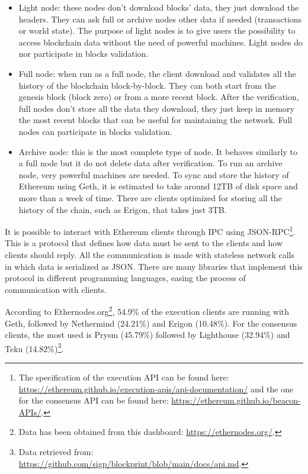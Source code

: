 \begin{itemize}
    \item Light node: these nodes don't download blocks' data, they just download the headers. They can ask full or archive nodes other data if needed (transactions or world state). The purpose of light nodes is to give users the possibility to access blockchain data without the need of powerful machines. Light nodes do nor participate in blocks validation.
    \item Full node: when run as a full node, the client download and validates all the history of the blockchain block-by-block. They can both start from the genesis block (block zero) or from a more recent block. After the verification, full nodes don't store all the data they download, they just keep in memory the most recent blocks that can be useful for maintaining the network. Full nodes can participate in blocks validation.
    \item Archive node: this is the most complete type of node. It behaves similarly to a full node but it do not delete data after verification. To run an archive node, very powerful machines are needed. To sync and store the history of Ethereum using Geth, it is estimated to take around 12TB of disk space and more than a week of time. There are clients optimized for storing all the history of the chain, such as Erigon, that takes just 3TB. 
\end{itemize}

It is possible to interact with Ethereum clients through IPC using JSON-RPC\footnote{The specification of the execution API can be found here: \url{https://ethereum.github.io/execution-apis/api-documentation/} and the one for the consensus API can be found here: \url{https://ethereum.github.io/beacon-APIs/}.}. This is a protocol that defines how data must be sent to the clients and how clients should reply. All the communication is made with stateless network calls in which data is serialized as JSON. There are many libraries that implement this protocol in different programming languages, easing the process of communication with clients.

According to Ethernodes.org\footnote{Data has been obtained from this dashboard: \url{https://ethernodes.org/}.}, 54.9\% of the execution clients are running with Geth, followed by Nethermind (24.21\%) and Erigon (10.48\%). For the consensus clients, the most used is Prysm (45.79\%) followed by Lighthouse (32.94\%) and Teku (14.82\%)\footnote{Data retrieved from: \url{https://github.com/sigp/blockprint/blob/main/docs/api.md}.}.

